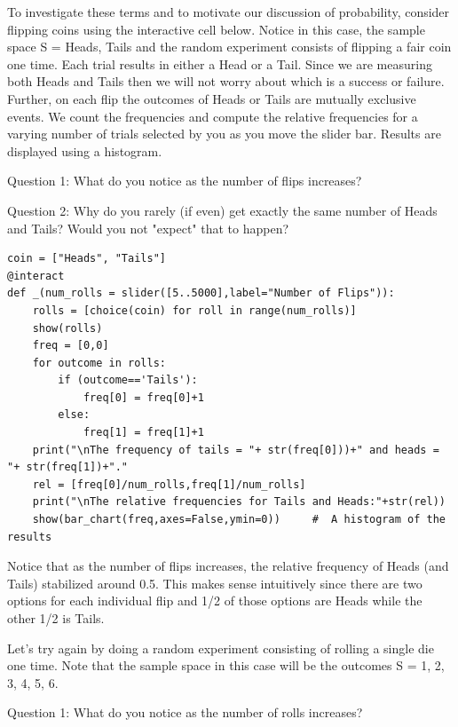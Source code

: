 \documentclass[10pt,]{book}
\theoremstyle{plain}
\theoremstyle{definition}
\theoremstyle{definition}
\numberwithin{equation}{section}
\begin{document}
\par
To investigate these terms and to motivate our discussion of probability, consider flipping coins using the interactive cell below. Notice in this case, the sample space S = {Heads, Tails} and the random experiment consists of flipping a fair coin one time. Each trial results in either a Head or a Tail. Since we are measuring both Heads and Tails then we will not worry about which is a success or failure. Further, on each flip the outcomes of Heads or Tails are mutually exclusive events. We count the frequencies and compute the relative frequencies for a varying number of trials selected by you as you move the slider bar. Results are displayed using a histogram.%
\par

	Question 1: What do you notice as the number of flips increases?
\par

	Question 2: Why do you rarely (if even) get exactly the same number of Heads and Tails? Would you not "expect"
	that to happen?
\begin{lstlisting}[style=sageinput]
coin = ["Heads", "Tails"]
@interact
def _(num_rolls = slider([5..5000],label="Number of Flips")):
	rolls = [choice(coin) for roll in range(num_rolls)]
	show(rolls)   
	freq = [0,0]
	for outcome in rolls:
		if (outcome=='Tails'):
			freq[0] = freq[0]+1
		else:
			freq[1] = freq[1]+1
	print("\nThe frequency of tails = "+ str(freq[0]))+" and heads = "+ str(freq[1])+"."
	rel = [freq[0]/num_rolls,freq[1]/num_rolls]
	print("\nThe relative frequencies for Tails and Heads:"+str(rel))
	show(bar_chart(freq,axes=False,ymin=0))     #  A histogram of the results
\end{lstlisting}
\par
Notice that as the number of flips increases, the relative frequency of Heads (and Tails)
	stabilized around 0.5. This makes sense intuitively since there are two options for each 
	individual flip and 1/2 of those options are Heads while the other 1/2 is Tails.%
\par

	Let's try again
	by doing a random experiment consisting of rolling a single die one time. Note that the sample space 
	in this case will be the outcomes S = {1, 2, 3, 4, 5, 6}.
\par

	Question 1: What do you notice as the number of rolls increases?
\par
\end{document}
